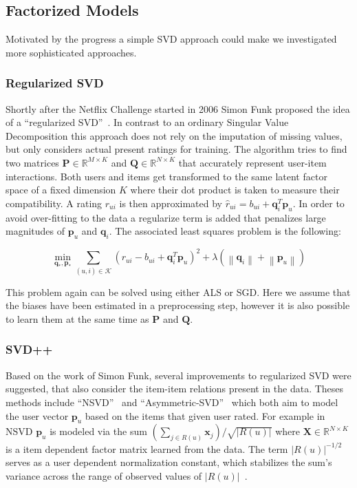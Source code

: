 \documentclass[10pt,conference,compsocconf]{IEEEtran}
\newcommand{\abs}[1]{\left\lvert#1\right\rvert}
\newcommand{\norm}[1]{\left\lVert#1\right\rVert}
\begin{document}
\subsection{Factorized Models}
\label{sub:factorized_models}

Motivated by the progress a simple SVD approach could make we investigated more
sophisticated approaches.

\subsubsection{Regularized SVD}
\label{ssub:regularized_svd}

Shortly after the Netflix Challenge started in 2006 Simon Funk proposed the idea
of a ``regularized SVD''~\cite{funk2006netflix}. In contrast to an ordinary
Singular Value Decomposition this approach does not rely on the imputation of
missing values, but only considers actual present ratings for training. The
algorithm tries to find two matrices $\mathbf P \in \mathbb R^{M \times K}$ and
$\mathbf Q \in \mathbb R^{N \times K}$ that accurately represent user-item
interactions. Both users and items get transformed to the same latent factor
space of a fixed dimension $K$ where their dot product is taken to measure their
compatibility. A rating $r_{ui}$ is then approximated by $\hat{r}_{ui} = b_{ui}
+ \mathbf q_i^{T}\mathbf p_u$. In order to avoid over-fitting to the data a
regularize term is added that penalizes large magnitudes of $\mathbf p_u$ and
$\mathbf q_i$. The associated least squares problem is the following:

\begin{equation}
  \min_{\mathbf q_*,\mathbf p_*} \sum_{(u,i) \in \mathcal K} {(r_{ui} - b_{ui} +
    \mathbf q_i^T \mathbf p_u)}^2 +
  \lambda (\norm{\mathbf q_i} + \norm{\mathbf p_u})
\end{equation}

This problem again can be solved using either ALS or SGD\@. Here we assume that
the biases have been estimated in a preprocessing step, however it is also
possible to learn them at the same time as $\mathbf P$ and $\mathbf Q$.

\subsubsection{SVD++}
\label{ssub:SVDpp}

Based on the work of Simon Funk, several improvements to regularized SVD were
suggested, that also consider the item-item relations present in the data.
Theses methods include ``NSVD''~\cite{paterek2007improving} and
``Asymmetric-SVD''~\cite{koren2008factorization} which both aim to model the
user vector $\mathbf p_u$ based on the items that given user rated. For example
in NSVD $\mathbf p_u$ is modeled via the sum $\left( \sum_{j \in R(u)} \mathbf
  x_j \right ) / \sqrt{\abs{R(u)}}$ where $\mathbf X \in \mathbb R^{N \times K}$
is a item dependent factor matrix learned from the data. The term
$\abs{R(u)}^{-1/2}$ serves as a user dependent normalization constant, which
stabilizes the sum's variance across the range of observed values of
$\abs{R(u)}$~\cite{koren2011advances}.
\end{document}
